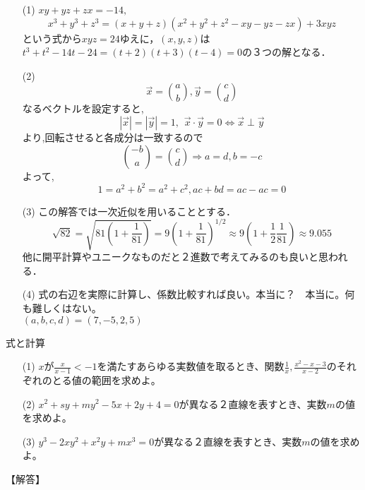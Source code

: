 \documentclass[a4paper,fleqn,dvipdfmx]{jsarticle}
\begin{document}
\begin{itemize}
    \item [(1)] $xy+yz+zx=-14,$$$x^3+y^3+z^3=(x+y+z)(x^2+y^2+z^2-xy-yz-zx)+3xyz$$という式から$xyz=24$ゆえに，$(x,y,z)$は$t^3+t^2-14t-24=(t+2)(t+3)(t-4)=0$の３つの解となる．
    \item [(2)]  $$\overrightarrow{ x }= { a \choose b }  , \overrightarrow{ y }= { c \choose d }  $$
なるベクトルを設定すると,$$ \left| \overrightarrow{ x } \right|=\left| \overrightarrow{ y } \right|=1,\hspace{5pt}   \overrightarrow{ x }\cdot \overrightarrow{ y }=0 \iff  \overrightarrow{ x }  \perp  \overrightarrow{ y } $$
より,回転させると各成分は一致するので
$${ -b \choose a }={ c \choose d } \Rightarrow a=d,b=-c$$
よって,
$$1=a^2+b^2=a^2+c^2,ac+bd=ac-ac=0$$
    \item [(3)] この解答では一次近似を用いることとする．$$\sqrt{82}=\sqrt{81(1+\frac{1}{81})}=9(1+\frac{1}{81})^{1/2}\approx 9(1+\frac{1}{2}\frac{1}{81}) \approx 9.055$$
    他に開平計算やユニークなものだと２進数で考えてみるのも良いと思われる．
    \item [(4)] 式の右辺を実際に計算し、係数比較すれば良い。本当に？　本当に。何も難しくはない。\\$(a,b,c,d)=(7,-5,2,5)$
\end{itemize}



\newpage
\begin{itembox}[l]{式と計算}
\begin{itemize}
    \item [(1)] $x$が$\frac{x}{x-1}<-1$を満たすあらゆる実数値を取るとき、関数$\frac{1}{x},\frac{x^2-x-3}{x-2}$のそれぞれのとる値の範囲を求めよ。
    \item [(2)] $x^2+sy+my^2-5x+2y+4=0$が異なる２直線を表すとき、実数$m$の値を求めよ。
    \item [(3)] $y^3-2xy^2+x^2y+mx^3=0$が異なる２直線を表すとき、実数$m$の値を求めよ。
\end{itemize}
\end{itembox}

\begin{flushleft}
【解答】
\end{flushleft}
\end{document}
